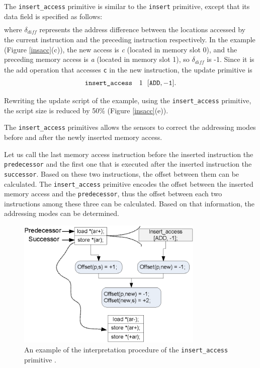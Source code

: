 The {\tt insert\_access} primitive is similar to the {\tt insert} primitive, except that its data field is specified as follows:
\begin{eqnarray}
[\textit{operation},\delta_{\textit{diff}}]\nonumber
\end{eqnarray}
where $\delta_{\textit{diff}}$ represents the address difference between the locations accessed by the current instruction and the preceding instruction respectively. In the example (Figure \ref{insacc}(c)), the new access is {\em c }(located in memory slot 0), and the preceding memory access is {\em a} (located in memory slot 1), so $\delta_{\textit{diff}}$ is -1.
Since it is the add operation that accesses {\tt c} in the new instruction, the update primitive is  
\begin{eqnarray}
 \texttt{insert\_access} ~~~1 ~~ [\tt{ADD}, -1].\nonumber
\end{eqnarray}

Rewriting the update script of the example, using the {\tt insert\_access} primitive, the script size is reduced by 50\% (Figure \ref{insacc}(e)). 

The {\tt insert\_access} primitives allows the sensors to correct the
addressing modes before and after the newly inserted memory access.

Let us call the last memory access instruction before the inserted instruction the {\tt 
predecessor} and the first one that is executed after the inserted instruction the
{\tt successor}.
Based on these two instructions, the offset between them can be calculated.
The {\tt insert\_access} primitive encodes the offset between the inserted
memory access and the {\tt predecessor}, thus the offset between each two 
instructions among these three can be calculated.
Based on that information, the addressing modes can be determined.

\begin{figure}[htbp]
\centering
\includegraphics[width=3.5in]{./figures/insert_access.eps}
\caption{An example of the interpretation procedure of the {\tt insert\_access} primitive .}
\label{insertaccess}
\end{figure}

